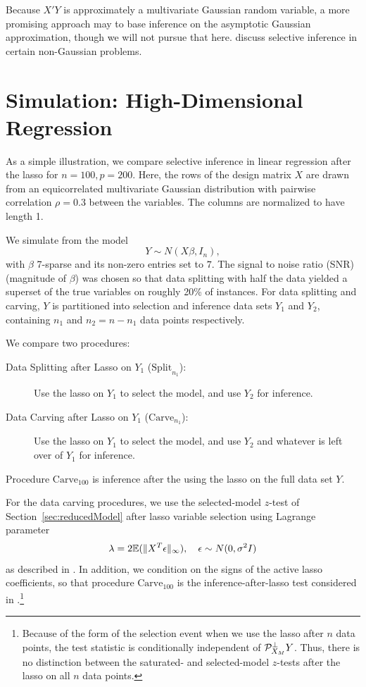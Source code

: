 \documentclass{article}
\theoremstyle{definition}
\newcommand{\bX}{X}
\newcommand{\proj}{\cP}
\newcommand{\sampOrData}{data }
\newcommand{\capSampOrData}{Data }
\begin{document}
Because $\bX'Y$ is approximately a multivariate Gaussian random variable, a more promising approach may to base inference on the asymptotic Gaussian approximation, though we will not pursue that here. \citet{tian2015asymptotics} discuss selective inference in certain non-Gaussian problems.


\section{Simulation: High-Dimensional Regression}\label{sec:simulation}

As a simple illustration, we compare selective inference in linear regression after the lasso for $n=100,p=200$. Here, the rows of the design matrix $\bX$ are drawn from an equicorrelated multivariate Gaussian distribution with pairwise correlation $\rho=0.3$ between the variables. The columns are normalized to
have length 1.

We simulate from the model
\begin{equation}
  Y \sim N(\bX \beta, I_n),
\end{equation}
with $\beta$ 7-sparse and its non-zero entries set to $7$. The signal to noise ratio (SNR) (magnitude of $\beta$) was chosen so that
\sampOrData splitting with half the data yielded a superset of the true variables on roughly 20\% of instances.
For \sampOrData splitting and carving,  $Y$ is partitioned into selection and inference data sets $Y_{1}$ and $Y_{2}$, containing $n_1$ and $n_2=n-n_1$ data points respectively.

We compare two procedures:
\begin{description}
\item[\capSampOrData Splitting after Lasso on $Y_{1}$ ($\text{Split}_{n_1}$):] Use the lasso on $Y_{1}$ to select the model, and use $Y_{2}$ for inference.
\item[\capSampOrData Carving after Lasso on $Y_{1}$ ($\text{Carve}_{n_1}$):] Use the lasso on $Y_{1}$ to select the model, and use $Y_{2}$ and whatever is left over of $Y_{1}$ for inference.
\end{description}
Procedure $\text{Carve}_{100}$ is inference after the using the lasso on the full data set $Y$.

For the \sampOrData carving procedures, we use the selected-model $z$-test of Section~\ref{sec:reducedModel} after lasso variable selection using Lagrange parameter
$$\lambda=2\mathbb{E}(\|X^T\epsilon\|_{\infty}), \quad \epsilon \sim N(0, \sigma^2 I)$$ as described in \citep{negahban_unified}. In addition, we condition on the signs of the active lasso coefficients, so that procedure $\text{Carve}_{100}$ is the inference-after-lasso test considered in \citet{lee2013exact}.\footnote{Because of the form of the selection event when we use the lasso after $n$ data points, the test statistic is conditionally independent of $\proj_{\bX_{M}}^\perp Y$. Thus, there is no distinction between the saturated- and selected-model $z$-tests after the lasso on all $n$ data points.}
\end{document}
